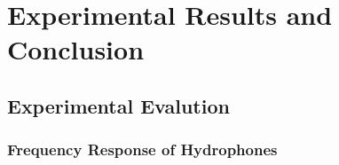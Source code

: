 
\chapter{Experimental Results and Conclusion} %

\label{Chapter4} %



\section{Experimental Evalution}


\subsection{Frequency Response of Hydrophones }

